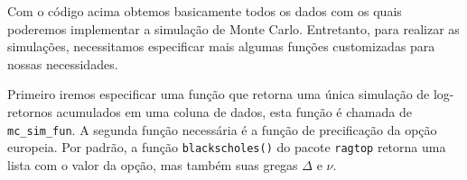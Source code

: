 \documentclass[]{book}
\newenvironment{Shaded}{\begin{snugshade}}{\end{snugshade}}
\newcommand{\KeywordTok}[1]{\textcolor[rgb]{0.13,0.29,0.53}{\textbf{#1}}}
\newcommand{\DataTypeTok}[1]{\textcolor[rgb]{0.13,0.29,0.53}{#1}}
\newcommand{\DecValTok}[1]{\textcolor[rgb]{0.00,0.00,0.81}{#1}}
\newcommand{\StringTok}[1]{\textcolor[rgb]{0.31,0.60,0.02}{#1}}
\newcommand{\CommentTok}[1]{\textcolor[rgb]{0.56,0.35,0.01}{\textit{#1}}}
\newcommand{\ControlFlowTok}[1]{\textcolor[rgb]{0.13,0.29,0.53}{\textbf{#1}}}
\newcommand{\OperatorTok}[1]{\textcolor[rgb]{0.81,0.36,0.00}{\textbf{#1}}}
\newcommand{\NormalTok}[1]{#1}
\theoremstyle{definition}
\theoremstyle{definition}
\theoremstyle{definition}
\theoremstyle{remark}
\begin{document}
Com o código acima obtemos basicamente todos os dados com os quais
poderemos implementar a simulação de Monte Carlo. Entretanto, para
realizar as simulações, necessitamos especificar mais algumas funções
customizadas para nossas necessidades.

Primeiro iremos especificar uma função que retorna uma única simulação
de log-retornos acumulados em uma coluna de dados, esta função é chamada
de \texttt{mc\_sim\_fun}. A segunda função necessária é a função de
precificação da opção europeia. Por padrão, a função
\texttt{blackscholes()} do pacote \texttt{ragtop} retorna uma lista com
o valor da opção, mas também suas gregas \(\Delta\) e \(\nu\).

\begin{Shaded}
\end{Shaded}
\end{document}
